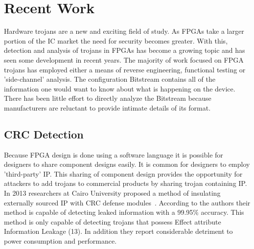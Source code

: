 \section{Recent Work}
Hardware trojans are a new and exciting field of study.
As \acrshort{FPGA}s take a larger portion of the \acrfull{IC} market the need for security becomes greater.
With this, detection and analysis of trojans in \acrshort{FPGA}s has become a growing topic and has seen some development in recent years.
The majority of work focused on \acrshort{FPGA} trojans has employed either a means of reverse engineering, functional testing or 'side-channel' analysis.
The configuration \gls{Bitstream} contains all of the information one would want to know about what is happening on the device.
There has been little effort to directly analyze the \gls{Bitstream} because manufacturers are reluctant to provide intimate details of its format.
  
\subsection{\acrfull{CRC} Detection} \label{sec:crcDetection}
Because \acrshort{FPGA} design is done using a software language it is possible for designers to share component designs easily.
It is common for designers to employ 'third-party' \acrfull{IP}. 
This sharing of component design provides the opportunity for attackers to add trojans to commercial products by sharing trojan containing \acrshort{IP}.
In 2013 researchers at Cairo University proposed a method of insulating externally sourced \acrshort{IP} with \acrfull{CRC} defense modules~\cite{crcDetection}.
According to the authors their method is capable of detecting leaked information with a 99.95\% accuracy.
This method is only capable of detecting trojans that possess Effect attribute Information Leakage (13).
In addition they report considerable detriment to power consumption and performance.

